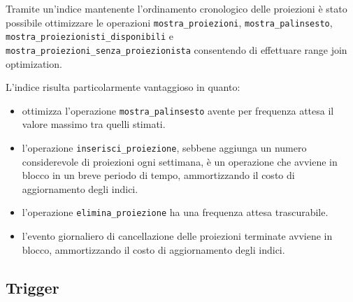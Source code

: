 Tramite un'indice mantenente l'ordinamento cronologico delle proiezioni è stato
possibile ottimizzare le operazioni \verb|mostra_proiezioni|,
\verb|mostra_palinsesto|, \verb|mostra_proiezionisti_disponibili| e
\verb|mostra_proiezioni_senza_proiezionista|
consentendo di effettuare
range join optimization.

L'indice risulta particolarmente vantaggioso in quanto:
\begin{itemize}
    \item ottimizza l'operazione \verb|mostra_palinsesto| avente per frequenza
          attesa il valore massimo tra quelli stimati.
    \item l'operazione \verb|inserisci_proiezione|, sebbene aggiunga un numero
          considerevole di proiezioni ogni settimana, è un operazione che
          avviene in blocco in un breve periodo di tempo, ammortizzando il
          costo di aggiornamento degli indici.
    \item l'operazione \verb|elimina_proiezione| ha una frequenza attesa
          trascurabile.
    \item l'evento giornaliero di cancellazione delle proiezioni terminate
          avviene in blocco, ammortizzando il costo di aggiornamento degli
          indici.
\end{itemize}

\pagebreak

\subsection*{Trigger}
%
%

